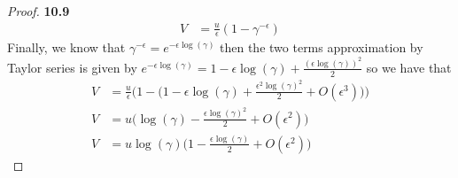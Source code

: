 \documentclass[11pt]{article}
\theoremstyle{definition}
\begin{document}
\begin{proof}{\textbf{10.9}}
\begin{align*}
            V &= \frac{u}{\epsilon}(1 -\gamma^{-\epsilon})
        \end{align*}
        Finally, we know that $\gamma^{-\epsilon} = e^{-\epsilon\log(\gamma)}$
        then the two terms approximation by Taylor series is given by
        $e^{-\epsilon\log(\gamma)} = 1 -\epsilon\log(\gamma) +
        \frac{(\epsilon\log(\gamma))^2}{2}$ so we have that
        \begin{align*}
            V &= \frac{u}{\epsilon}\bigg(1 - \bigg(1 -\epsilon\log(\gamma)
            + \frac{\epsilon^2\log(\gamma)^2}{2} + O(\epsilon^3)\bigg)\bigg)\\
            V &= u\bigg(\log(\gamma)
            - \frac{\epsilon\log(\gamma)^2}{2} + O(\epsilon^2)\bigg)\\
            V &= u\log(\gamma)\bigg(1
            - \frac{\epsilon\log(\gamma)}{2}+ O(\epsilon^2)\bigg)
        \end{align*}
    \end{proof}
\cleardoublepage
\end{document}
